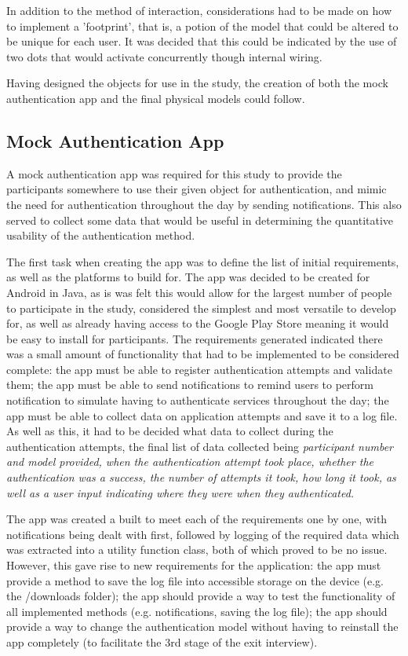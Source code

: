 \documentclass{l4proj}
\begin{document}
In addition to the method of interaction, considerations had to be made on how to implement a 'footprint', that is, a potion of the model that could be altered to be unique for each user. It was decided that this could be indicated by the use of two dots that would activate concurrently though internal wiring.

Having designed the objects for use in the study, the creation of both the mock authentication app and the final physical models could follow.

\subsection{Mock Authentication App} \label{ssecapp}

A mock authentication app was required for this study to provide the participants somewhere to use their given object for authentication, and mimic the need for authentication throughout the day by sending notifications. This also served to collect some data that would be useful in determining the quantitative usability of the authentication method.
 
The first task when creating the app was to define the list of initial requirements, as well as the platforms to build for. The app was decided to be created for Android in Java, as is was felt this would allow for the largest number of people to participate in the study, considered the simplest and most versatile to develop for, as well as already having access to the Google Play Store meaning it would be easy to install for participants. The requirements generated indicated there was a small amount of functionality that had to be implemented to be considered complete: the app must be able to register authentication attempts and validate them; the app must be able to send notifications to remind users to perform notification to simulate having to authenticate services throughout the day; the app must be able to collect data on application attempts and save it to a log file. As well as this, it had to be decided what data to collect during the authentication attempts, the final list of data collected being \textit{participant number and model provided, when the authentication attempt took place, whether the authentication was a success, the number of attempts it took, how long it took, as well as a user input indicating where they were when they authenticated.}

The app was created a built to meet each of the requirements one by one, with notifications being dealt with first, followed by logging of the required data which was extracted into a utility function class, both of which proved to be no issue. However, this gave rise to new requirements for the application: the app must provide a method to save the log file into accessible storage on the device (e.g. the /downloads folder); the app should provide a way to test the functionality of all implemented methods (e.g. notifications, saving the log file); the app should provide a way to change the authentication model without having to reinstall the app completely (to facilitate the 3rd stage of the exit interview).
\end{document}
